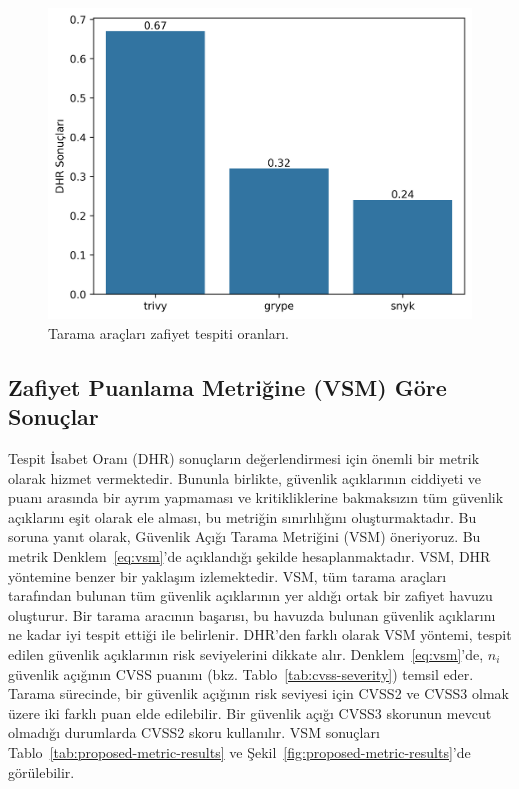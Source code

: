 \begin{figure}[!htbp]
    \centering
    \includegraphics[width=1\linewidth]{images/s1/DHR.png}
    \caption{Tarama araçları zafiyet tespiti oranları.}\label{fig:hit-and-miss}
\end{figure}

\subsection{Zafiyet Puanlama Metriğine (VSM) Göre Sonuçlar}\label{subsec:ResultsbyVulnerabilityScoringMetric}

Tespit İsabet Oranı (DHR) sonuçların değerlendirmesi için önemli bir metrik olarak hizmet vermektedir. Bununla birlikte, güvenlik açıklarının ciddiyeti ve puanı arasında bir ayrım yapmaması ve kritikliklerine bakmaksızın tüm güvenlik açıklarını eşit olarak ele alması, bu metriğin sınırlılığını oluşturmaktadır. Bu soruna yanıt olarak, Güvenlik Açığı Tarama Metriğini (VSM) öneriyoruz. Bu metrik Denklem~\ref{eq:vsm}'de açıklandığı şekilde hesaplanmaktadır. VSM, DHR yöntemine benzer bir yaklaşım izlemektedir. VSM, tüm tarama araçları tarafından bulunan tüm güvenlik açıklarının yer aldığı ortak bir zafiyet havuzu oluşturur. Bir tarama aracının başarısı, bu havuzda bulunan güvenlik açıklarını ne kadar iyi tespit ettiği ile belirlenir. DHR'den farklı olarak VSM yöntemi, tespit edilen güvenlik açıklarının risk seviyelerini dikkate alır. Denklem~\ref{eq:vsm}'de, $n_i$ güvenlik açığının CVSS puanını (bkz. Tablo~\ref{tab:cvss-severity}) temsil eder. Tarama sürecinde, bir güvenlik açığının risk seviyesi için CVSS2 ve CVSS3 olmak üzere iki farklı puan elde edilebilir. Bir güvenlik açığı CVSS3 skorunun mevcut olmadığı durumlarda CVSS2 skoru kullanılır. VSM sonuçları Tablo~\ref{tab:proposed-metric-results} ve Şekil~\ref{fig:proposed-metric-results}'de görülebilir.


